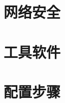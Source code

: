 \documentclass[a4paper,12pt]{report}
\begin{document}
\chapter{网络安全}

\chapter{工具软件}

\chapter{配置步骤}
\end{document}

